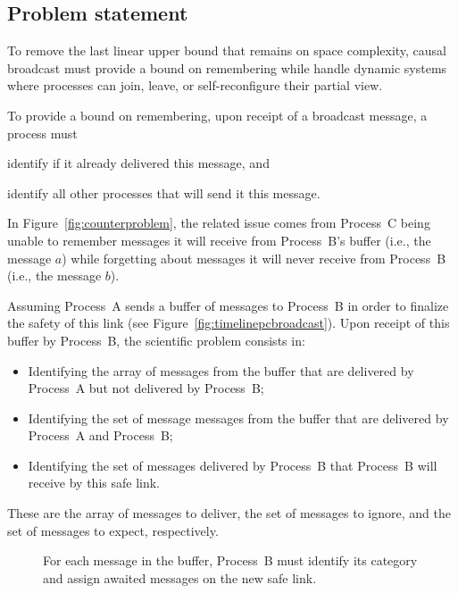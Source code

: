 \subsection{Problem statement}
\label{subsec:problemstatement}

To remove the last linear upper bound that remains on space complexity, causal
broadcast must provide a bound on remembering while handle dynamic systems where
processes can join, leave, or self-reconfigure their partial view.

To provide a bound on remembering, upon receipt of a broadcast message, a
process must
\begin{inparaenum}[(i)]
\item identify if it already delivered this message, and
\item identify all other processes that will send it this message.
\end{inparaenum}
In Figure~\ref{fig:counterproblem}, the related issue comes from Process~C being
unable to remember messages it will receive from Process~B's buffer (i.e., the
message $a$) while forgetting about messages it will never receive from
Process~B (i.e., the message $b$).

\begin{problem*}
Assuming Process~A sends a buffer of messages to Process~B in order to finalize
the safety of this link (see Figure~\ref{fig:timelinepcbroadcast}). Upon receipt
of this buffer by Process~B, the scientific problem consists in:
\begin{itemize}[leftmargin=*]
\item Identifying the array of messages from the buffer that are delivered by
  Process~A but not delivered by Process~B;
\item Identifying the set of message messages from the buffer that are delivered
  by Process~A and Process~B;
\item Identifying the set of messages delivered by Process~B that Process~B will
  receive by this safe link.
\end{itemize}
These are the array of messages to deliver, the set of messages to ignore, and
the set of messages to expect, respectively.
\end{problem*}

\begin{figure}
  \begin{center}
    
    \caption{\label{fig:problemstatement}For each message in the buffer,
      Process~B must identify its category and assign awaited messages on the
      new safe link.}
  \end{center}
\end{figure}


